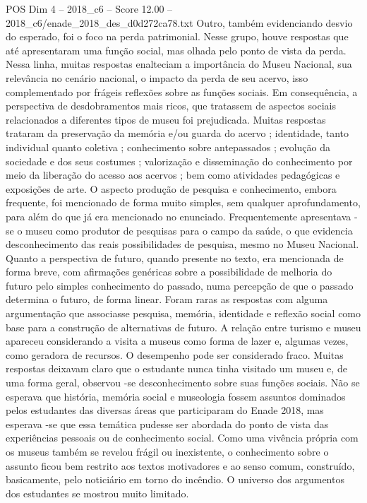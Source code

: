 \begin{textsample}{POS Dim 4 – 2018\_c6 – Score 12.00 – 2018\_c6/enade\_2018\_des\_d0d272ca78.txt}
Outro, também evidenciando desvio do esperado, foi o foco na perda patrimonial.
Nesse grupo, houve respostas que até apresentaram uma função social, mas olhada pelo ponto de vista da perda.
Nessa linha, muitas respostas enalteciam a importância do Museu Nacional, sua relevância no cenário nacional, o impacto da perda de seu acervo, isso complementado por frágeis reflexões sobre as funções sociais.
Em consequência, a perspectiva de desdobramentos mais ricos, que tratassem de aspectos sociais relacionados a diferentes tipos de museu foi prejudicada.
Muitas respostas trataram da preservação da memória e/ou guarda do acervo ; identidade, tanto individual quanto coletiva ; conhecimento sobre antepassados ; evolução da sociedade e dos seus costumes ; valorização e disseminação do conhecimento por meio da liberação do acesso aos acervos ; bem como atividades pedagógicas e exposições de arte.
O aspecto produção de pesquisa e conhecimento, embora frequente, foi mencionado de forma muito simples, sem qualquer aprofundamento, para além do que já era mencionado no enunciado.
Frequentemente apresentava -se o museu como produtor de pesquisas para o campo da saúde, o que evidencia desconhecimento das reais possibilidades de pesquisa, mesmo no Museu Nacional.
Quanto a perspectiva de futuro, quando presente no texto, era mencionada de forma breve, com afirmações genéricas sobre a possibilidade de melhoria do futuro pelo simples conhecimento do passado, numa percepção de que o passado determina o futuro, de forma linear.
Foram raras as respostas com alguma argumentação que associasse pesquisa, memória, identidade e reflexão social como base para a construção de alternativas de futuro.
A relação entre turismo e museu apareceu considerando a visita a museus como forma de lazer e, algumas vezes, como geradora de recursos.
O desempenho pode ser considerado fraco.
Muitas respostas deixavam claro que o estudante nunca tinha visitado um museu e, de uma forma geral, observou -se desconhecimento sobre suas funções sociais.
Não se esperava que história, memória social e museologia fossem assuntos dominados pelos estudantes das diversas áreas que participaram do Enade 2018, mas esperava -se que essa temática pudesse ser abordada do ponto de vista das experiências pessoais ou de conhecimento social.
Como uma vivência própria com os museus também se revelou frágil ou inexistente, o conhecimento sobre o assunto ficou bem restrito aos textos motivadores e ao senso comum, construído, basicamente, pelo noticiário em torno do incêndio.
O universo dos argumentos dos estudantes se mostrou muito limitado.

\end{textsample}
